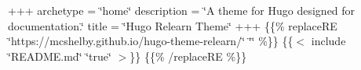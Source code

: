 +++ archetype = \char`\"{}home\char`\"{} description = \char`\"{}\+A theme for Hugo designed for documentation.\char`\"{} title = \char`\"{}\+Hugo Relearn Theme\char`\"{} +++ \{\{\% replace\+RE \char`\"{}https\+://mcshelby.\+github.\+io/hugo-\/theme-\/relearn/\char`\"{} \char`\"{}\char`\"{} \%\}\} \{\{$<$ include \char`\"{}\+README.\+md\char`\"{} \char`\"{}true\char`\"{} $>$\}\} \{\{\% /replace\+RE \%\}\} 